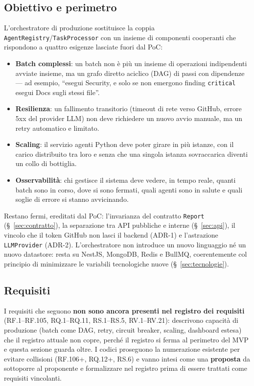 \documentclass[11pt,a4paper]{article}
\begin{document}
\subsection{Obiettivo e perimetro}

L'orchestratore di produzione sostituisce la coppia \texttt{AgentRegistry}/\texttt{TaskProcessor} con un insieme di componenti cooperanti che rispondono a quattro esigenze lasciate fuori dal PoC:

\begin{itemize}
    \item \textbf{Batch complessi}: un batch non è più un insieme di operazioni indipendenti avviate insieme, ma un grafo diretto aciclico (DAG) di passi con dipendenze --- ad esempio, ``esegui Security, e solo se non emergono finding \texttt{critical} esegui Docs sugli stessi file''.
    \item \textbf{Resilienza}: un fallimento transitorio (timeout di rete verso GitHub, errore 5xx del provider LLM) non deve richiedere un nuovo avvio manuale, ma un retry automatico e limitato.
    \item \textbf{Scaling}: il servizio agenti Python deve poter girare in più istanze, con il carico distribuito tra loro e senza che una singola istanza sovraccarica diventi un collo di bottiglia.
    \item \textbf{Osservabilità}: chi gestisce il sistema deve vedere, in tempo reale, quanti batch sono in corso, dove si sono fermati, quali agenti sono in salute e quali soglie di errore si stanno avvicinando.
\end{itemize}

Restano fermi, ereditati dal PoC: l'invarianza del contratto \texttt{Report} (\S~\ref{sec:contratto}), la separazione tra API pubbliche e interne (\S~\ref{sec:api}), il vincolo che il token GitHub non lasci il backend (ADR-1) e l'astrazione \texttt{LLMProvider} (ADR-2). L'orchestratore non introduce un nuovo linguaggio né un nuovo datastore: resta su NestJS, MongoDB, Redis e BullMQ, coerentemente col principio di minimizzare le variabili tecnologiche nuove (\S~\ref{sec:tecnologie}).

\subsection{Requisiti}
\label{sub:orch-requisiti}

I requisiti che seguono \textbf{non sono ancora presenti nel registro dei requisiti} (RF.1--RF.105, RQ.1--RQ.11, RS.1--RS.5, RV.1--RV.21): descrivono capacità di produzione (batch come DAG, retry, circuit breaker, scaling, dashboard estesa) che il registro attuale non copre, perché il registro si ferma al perimetro del MVP e questa sezione guarda oltre. I codici proseguono la numerazione esistente per evitare collisioni (RF.106+, RQ.12+, RS.6) e vanno intesi come una \textbf{proposta} da sottoporre al proponente e formalizzare nel registro prima di essere trattati come requisiti vincolanti.
\end{document}
